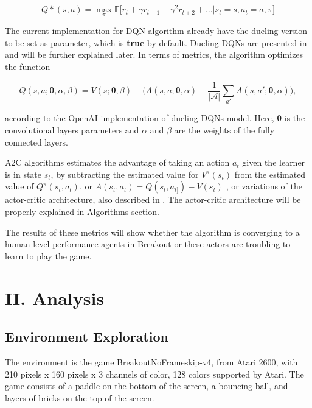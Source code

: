 \documentclass[11pt,twoside,a4paper]{article}
\begin{document}
$$
  Q*(s,a) = \max_{\pi}{\mathbb{E}\bigl[r_{t} + \gamma r_{t + 1} + \gamma^{2} r_{t + 2} + \ldots
  | s_{t} = s, a_{t} = a, \pi \bigr]}
$$

The current implementation for DQN algorithm already have the dueling
version to be set as parameter, which is \textbf{true} by default. Dueling DQNs
are presented in \cite{DBLP:journals/corr/WangFL15} and will be further
explained later. In terms of metrics, the algorithm optimizes the function

$$
  Q(s,a;\boldsymbol{\theta},\alpha,\beta) =
  V(s;\boldsymbol{\theta},\beta) + \biggl( A(s,a;\boldsymbol{\theta},\alpha)
  - \frac{1}{|\mathcal{A}|} \sum_{a'} A(s,a';\boldsymbol{\theta},\alpha) \biggl),
$$

\noindent according to the OpenAI implementation of dueling DQNs model. Here,
$ \boldsymbol{\theta} $ is the convolutional layers parameters and $ \alpha $
and $ \beta $ are the weights of the fully connected layers.

A2C algorithms estimates the advantage of taking an action
$ a_{t} $ given the learner is in state $ s_{t} $, by subtracting the
estimated value for $ V^{\pi}(s_{t}) $ from the estimated value of
$ Q^{\pi}(s_{t},a_{t}) $, or $ A(s_{t},a_{t}) = Q(s_{t},a_{t]}) - V(s_{t}) $
\cite{DBLP:journals/corr/MnihBMGLHSK16}, or variations of the actor-critic
architecture, also described in \cite{DBLP:conf/amcc/DegrisPS12}.
The actor-critic architecture will be properly explained in Algorithms section.

The results of these metrics will show whether the algorithm is converging to
a human-level performance agents in Breakout or these actors are troubling to
learn to play the game.

\section*{II. Analysis}

\subsection*{Environment Exploration}

The environment is the game BreakoutNoFrameskip-v4, from Atari 2600, with 210
pixels x 160 pixels x 3 channels of color, 128 colors supported by Atari. The
game consists of a paddle on the bottom of the screen, a bouncing ball, and
layers of bricks on the top of the screen.
\end{document}
